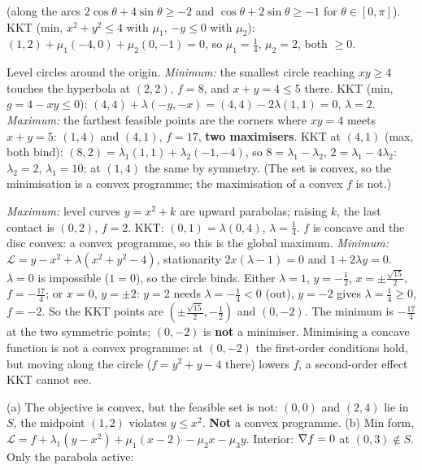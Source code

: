 \begin{solutions}
        (along the arcs $2\cos\theta+4\sin\theta\ge-2$ and
        $\cos\theta+2\sin\theta\ge-1$ for $\theta\in[0,\pi]$). KKT (min,
        $x^{2}+y^{2}\le4$ with $\mu_1$, $-y\le0$ with $\mu_2$):
        $(1,2)+\mu_1(-4,0)+\mu_2(0,-1)=0$, so $\mu_1=\tfrac14$, $\mu_2=2$,
        both $\ge0$. \checkmark
  \item Level circles around the origin. \emph{Minimum:} the smallest
        circle reaching $xy\ge4$ touches the hyperbola at $(2,2)$, $f=8$,
        and $x+y=4\le5$ there. KKT (min, $g=4-xy\le0$):
        $(4,4)+\lambda(-y,-x)=(4,4)-2\lambda(1,1)=0$, $\lambda=2$.
        \emph{Maximum:} the farthest feasible points are the corners where
        $xy=4$ meets $x+y=5$: $(1,4)$ and $(4,1)$, $f=17$, \textbf{two
        maximisers}. KKT at $(4,1)$ (max, both bind):
        $(8,2)=\lambda_1(1,1)+\lambda_2(-1,-4)$, so $8=\lambda_1-\lambda_2$,
        $2=\lambda_1-4\lambda_2$: $\lambda_2=2$, $\lambda_1=10$; at $(1,4)$
        the same by symmetry. (The set is convex, so the minimisation is a
        convex programme; the maximisation of a convex $f$ is not.)
  \item \emph{Maximum:} level curves $y=x^{2}+k$ are upward parabolas;
        raising $k$, the last contact is $(0,2)$, $f=2$. KKT: $(0,1)=\lambda(0,4)$,
        $\lambda=\tfrac14$. $f$ is concave and the disc convex: a convex
        programme, so this is the global maximum. \emph{Minimum:}
        $\mathcal{L}=y-x^{2}+\lambda(x^{2}+y^{2}-4)$, stationarity
        $2x(\lambda-1)=0$ and $1+2\lambda y=0$. $\lambda=0$ is impossible
        ($1=0$), so the circle binds. Either $\lambda=1$, $y=-\tfrac12$,
        $x=\pm\tfrac{\sqrt{15}}{2}$, $f=-\tfrac{17}{4}$; or $x=0$, $y=\pm2$:
        $y=2$ needs $\lambda=-\tfrac14<0$ (out), $y=-2$ gives
        $\lambda=\tfrac14\ge0$, $f=-2$. So the KKT points are
        $(\pm\tfrac{\sqrt{15}}2,-\tfrac12)$ and $(0,-2)$. The minimum is
        $-\tfrac{17}{4}$ at the two symmetric points; $(0,-2)$ is \textbf{not}
        a minimiser. Minimising a concave function is not a convex
        programme: at $(0,-2)$ the first-order conditions hold, but moving
        along the circle ($f=y^{2}+y-4$ there) lowers $f$, a second-order
        effect KKT cannot see.
  \item (a) The objective is convex, but the feasible set is not:
        $(0,0)$ and $(2,4)$ lie in $S$, the midpoint $(1,2)$ violates
        $y\le x^{2}$. \textbf{Not} a convex programme.
        (b) Min form, $\mathcal{L}=f+\lambda_1(y-x^{2})+\mu_1(x-2)-\mu_2x-\mu_3y$.
        Interior: $\nabla f=0$ at $(0,3)\notin S$. Only the parabola active:

\end{solutions}
